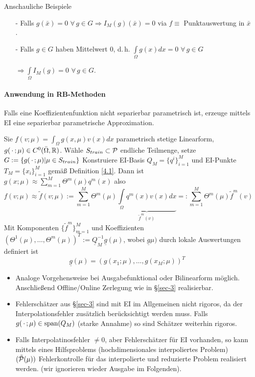 \begin{bem} Anschauliche Beispiele
	\begin{itemize}
		\item[-] Falls $g(\bar{x}) = 0 \,\, \forall \, g \in G \Rightarrow I_M(g) (\bar{x})=0$ via $f \equiv$ Punktauswertung in $\bar{x}$.
		\item[-] Falls $g \in G$ haben Mittelwert $0$, d.\,h. $\int\limits_{\Omega} g(x) dx = 0 \,\, \forall \, g \in G$
		
		$\Rightarrow \int\limits_{\Omega} I_M(g) = 0 \,\, \forall \, g \in G.$
	\end{itemize}
\end{bem}

\paragraph*{Anwendung in RB-Methoden}
Falls eine Koeffizientenfunktion nicht separierbar parametrisch ist, erzeuge mittels EI eine separierbar parametrische Approximation.

\begin{defn}
Sie $f(v; \mu) = \int_{\Omega} g(x, \mu) v(x) dx$ parametrisch stetige Linearform, $g(\,\cdot\,; \mu) \in C^0 (\bar{\Omega},\mathbb{R})$. Wähle $S_{train} \subset \mathcal{P}$ endliche Teilmenge, setze $G:= \{ g(\,\cdot\,;\mu) | \mu \in S_{train} \}$ Konstruiere EI-Basis $Q_M = \{q^i\}_{i=1}^M$ und EI-Punkte $T_M = \{x_i\}_{i=1}^M$ gemäß Definition \ref{4.1}. Dann ist $g(x;\mu) \approx \sum\limits_{m=1}^M \Theta^m(\mu)q^m(x)$ also
\[
	f(v;\mu) \approx \tilde{f}(v;\mu) := \sum\limits_{m=1}^M \Theta^m (\mu) \underbrace{\int\limits_{\Omega} q^m(x)v(x) dx}_{\tilde{f}^m(v)} =: \sum\limits_{m=1}^M \Theta^m(\mu) \tilde{f}^m(v)
\] 
Mit Komponenten $\{\tilde{f}^m\}_{m=1}^M$ und Koeffizienten $(\Theta^1(\mu), \dots, \Theta^m(\mu))^T := \underline{Q}_{M}^{-1} \underline{g}(\mu)$, wobei $\underline{g}\mu)$ durch lokale Auswertungen definiert ist
\[
	\underline{g}(\mu) = (g(x_1;\mu),\dots,g(x_M;\mu))^T
\]
\end{defn}

\begin{bem} \beginwithlistbem
	\begin{itemize}
		\item Analoge Vorgehensweise bei Ausgabefunktional oder Bilinearform möglich. Anschließend Offline/Online Zerlegung wie in §\ref{sec-3} realisierbar.
		\item Fehlerschätzer aus §\ref{sec-3} sind mit EI  im Allgemeinen nicht rigoros, da der Interpolationsfehler zusätzlich berücksichtigt werden muss. Falls $g(\,\cdot\,;\mu) \in \operatorname{span} (Q_M)$ (starke Annahme) so sind Schätzer weiterhin rigoros.
		\item Falls Interpolatinosfehler $\neq 0$, aber Fehlerschätzer für EI vorhanden, so kann mittels eines Hilfsproblems (hochdimensionales interpoliertes Problem) $(\tilde{\mathcal{P}}(\mu))$ Fehlerkontrolle für das interpolierte und reduzierte Problem realisiert werden. (wir ignorieren wieder Ausgabe im Folgenden).
	\end{itemize}
\end{bem}

